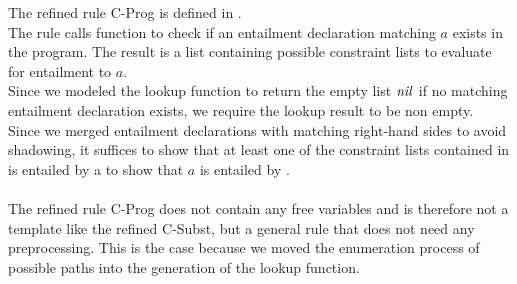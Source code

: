 %
The refined rule C-Prog is defined in .\\
The rule calls function  to check
if an entailment declaration matching $a$ exists in the program.
The result is a list containing possible constraint lists
to evaluate for entailment to $a$.\\
Since we modeled the lookup function to return the empty list $\mathit{nil}$
if no matching entailment declaration exists,
we require the lookup result  to be non empty.\\
Since we merged entailment declarations with matching right-hand sides
to avoid shadowing, it suffices to show that at least one
of the constraint lists contained in 
is entailed by \ovl a to show that $a$ is entailed by .\\
\\
The refined rule C-Prog does not contain any free variables
and is therefore not a template like the refined C-Subst,
but a general rule that does not need any preprocessing.
This is the case because we moved the enumeration process
of possible paths into the generation of the lookup function.

